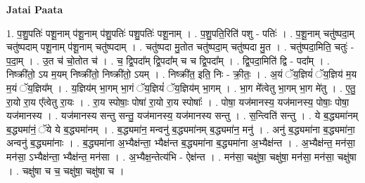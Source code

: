 \documentclass[17pt]{extarticle}
\begin{document}
\textbf{Jatai Paata} \newline

1. प॒शु॒पतिः॑ पशू॒नाम् प॑शू॒नाम् प॑शु॒पतिः॑ पशु॒पतिः॑ पशू॒नाम् । . प॒शु॒पति॒रिति॑ पशु - पतिः॑ । . प॒शू॒नाम् चतु॑ष्पदा॒म् चतु॑ष्पदाम् पशू॒नाम् प॑शू॒नाम् चतु॑ष्पदाम् । . चतु॑ष्पदा मु॒तोत चतु॑ष्पदा॒म् चतु॑ष्पदा मु॒त । . चतु॑ष्पदा॒मिति॒ चतुः॑ - प॒दा॒म् । . उ॒त च॑ चो॒तोत च॑ । . च॒ द्वि॒पदा᳚म् द्वि॒पदा᳚म् च च द्वि॒पदा᳚म् । . द्वि॒पदा॒मिति॑ द्वि - पदा᳚म् । . निष्क्री॑तो॒ ऽय म॒यम् निष्क्री॑तो॒ निष्क्री॑तो॒ ऽयम् । . निष्क्री॑त॒ इति॒ निः - क्री॒तः॒ । . अ॒यं ॅय॒ज्ञियं॑ ॅय॒ज्ञिय॑ म॒य म॒यं ॅय॒ज्ञिय᳚म् । . य॒ज्ञिय॑म् भा॒गम् भा॒गं ॅय॒ज्ञियं॑ ॅय॒ज्ञिय॑म् भा॒गम् । . भा॒ग मे᳚त्वेतु भा॒गम् भा॒ग मे॑तु । . ए॒तु॒ रा॒यो रा॒य ए᳚त्वेतु रा॒यः । . रा॒य स्पोषाः॒ पोषा॑ रा॒यो रा॒य स्पोषाः᳚ । . पोषा॒ यज॑मानस्य॒ यज॑मानस्य॒ पोषाः॒ पोषा॒ यज॑मानस्य । . यज॑मानस्य सन्तु सन्तु॒ यज॑मानस्य॒ यज॑मानस्य सन्तु । . स॒न्त्विति॑ सन्तु । . ये ब॒द्ध्यमा॑नम् ब॒द्ध्यमा॑नं॒ ॅये ये ब॒द्ध्यमा॑नम् । . ब॒द्ध्यमा॑न॒ मन्वनु॑ ब॒द्ध्यमा॑नम् ब॒द्ध्यमा॑न॒ मनु॑ । . अनु॑ ब॒द्ध्यमा॑ना ब॒द्ध्यमा॑ना॒ अन्वनु॑ ब॒द्ध्यमा॑नाः । . ब॒द्ध्यमा॑ना अ॒भ्यैक्ष॑न्ता॒ भ्यैक्ष॑न्त ब॒द्ध्यमा॑ना ब॒द्ध्यमा॑ना अ॒भ्यैक्ष॑न्त । . अ॒भ्यैक्ष॑न्त॒ मन॑सा॒ मन॑सा॒ ऽभ्यैक्ष॑न्ता॒ भ्यैक्ष॑न्त॒ मन॑सा । . अ॒भ्यैक्ष॒न्तेत्य॑भि - ऐक्ष॑न्त । . मन॑सा॒ चक्षु॑षा॒ चक्षु॑षा॒ मन॑सा॒ मन॑सा॒ चक्षु॑षा । . चक्षु॑षा च च॒ चक्षु॑षा॒ चक्षु॑षा च । \newline
\end{document}
